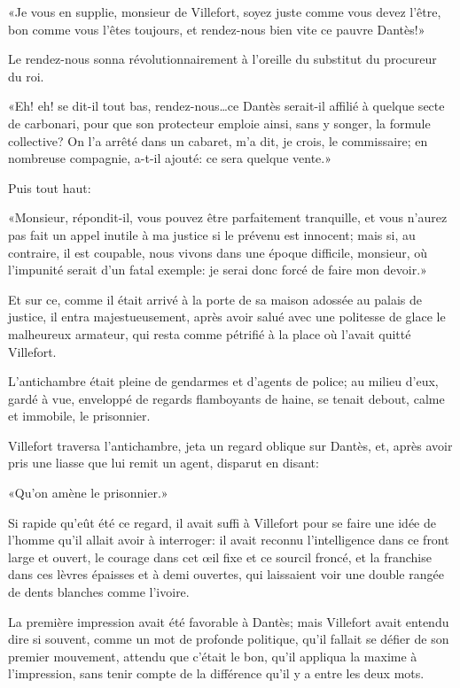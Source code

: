 «Je vous en supplie, monsieur de Villefort, soyez juste comme vous devez l'être, bon comme vous l'êtes toujours, et rendez-nous bien vite ce pauvre Dantès!»

Le rendez-nous sonna révolutionnairement à l'oreille du substitut du procureur du roi.

«Eh! eh! se dit-il tout bas, rendez-nous\dots ce Dantès serait-il affilié à quelque secte de carbonari, pour que son protecteur emploie ainsi, sans y songer, la formule collective? On l'a arrêté dans un cabaret, m'a dit, je crois, le commissaire; en nombreuse compagnie, a-t-il ajouté: ce sera quelque vente.»

Puis tout haut:

«Monsieur, répondit-il, vous pouvez être parfaitement tranquille, et vous n'aurez pas fait un appel inutile à ma justice si le prévenu est innocent; mais si, au contraire, il est coupable, nous vivons dans une époque difficile, monsieur, où l'impunité serait d'un fatal exemple: je serai donc forcé de faire mon devoir.»

Et sur ce, comme il était arrivé à la porte de sa maison adossée au palais de justice, il entra majestueusement, après avoir salué avec une politesse de glace le malheureux armateur, qui resta comme pétrifié à la place où l'avait quitté Villefort.

L'antichambre était pleine de gendarmes et d'agents de police; au milieu d'eux, gardé à vue, enveloppé de regards flamboyants de haine, se tenait debout, calme et immobile, le prisonnier.

Villefort traversa l'antichambre, jeta un regard oblique sur Dantès, et, après avoir pris une liasse que lui remit un agent, disparut en disant:

«Qu'on amène le prisonnier.»

Si rapide qu'eût été ce regard, il avait suffi à Villefort pour se faire une idée de l'homme qu'il allait avoir à interroger: il avait reconnu l'intelligence dans ce front large et ouvert, le courage dans cet œil fixe et ce sourcil froncé, et la franchise dans ces lèvres épaisses et à demi ouvertes, qui laissaient voir une double rangée de dents blanches comme l'ivoire.

La première impression avait été favorable à Dantès; mais Villefort avait entendu dire si souvent, comme un mot de profonde politique, qu'il fallait se défier de son premier mouvement, attendu que c'était le bon, qu'il appliqua la maxime à l'impression, sans tenir compte de la différence qu'il y a entre les deux mots.


